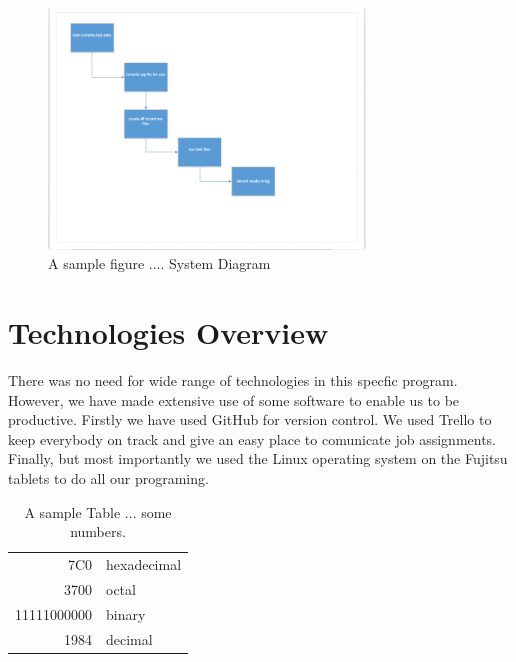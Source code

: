 \begin{figure}[tbh]
\begin{center}
\includegraphics[width=0.75\textwidth]{./Diagran}
\end{center}
\caption{A sample figure .... System Diagram \label{systemdiagram}}
\end{figure}

\section{Technologies Overview}
There was no need for wide range of technologies in this specfic program. However, we have made extensive use of some software to enable us to be productive. Firstly we have used GitHub for version control. We used Trello to keep everybody on track and give an easy place to comunicate job assignments. Finally, but most importantly we used the Linux operating system on the Fujitsu tablets to do all our programing.   
\begin{table}[tbh]
\begin{center}
\begin{tabular}{|r|l|}
  \hline
  7C0 & hexadecimal \\
  3700 & octal \\ \cline{2-2}
  11111000000 & binary \\
  \hline \hline
  1984 & decimal \\
  \hline
\end{tabular}
\caption{A sample Table ... some numbers. \label{somenumbers}}
\end{center}
\end{table}

